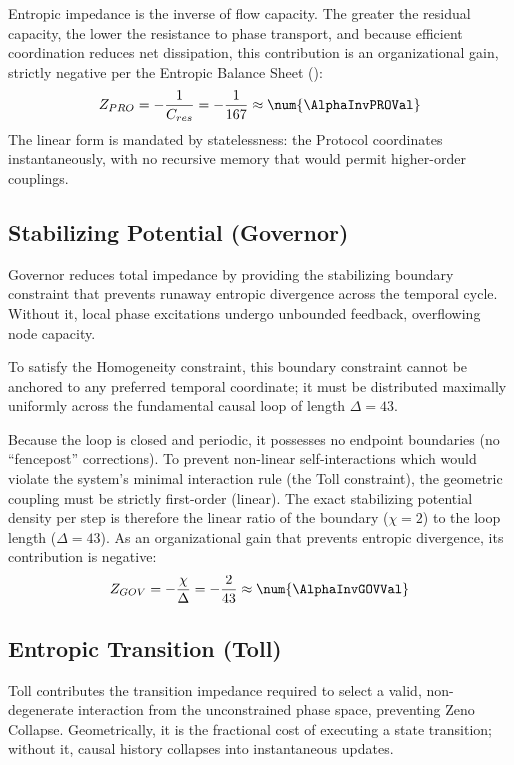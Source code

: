 Entropic impedance is the inverse of flow capacity. The greater the residual capacity, the lower the resistance to phase transport, and because efficient coordination reduces net dissipation, this contribution is an organizational gain, strictly negative per the Entropic Balance Sheet ():
\begin{equation}
    Z_{PRO} = -\frac{1}{C_{res}} = -\frac{1}{167} \approx \num{\AlphaInvPROVal}
\end{equation}
The linear form is mandated by statelessness: the Protocol coordinates instantaneously, with no recursive memory that would permit higher-order couplings.

\subsection{Stabilizing Potential (Governor)}
\label{subsec:alpha_gov}
Governor reduces total impedance by providing the stabilizing boundary constraint that prevents runaway entropic divergence across the temporal cycle. Without it, local phase excitations undergo unbounded feedback, overflowing node capacity.
 
To satisfy the Homogeneity constraint, this boundary constraint cannot be anchored to any preferred temporal coordinate; it must be distributed maximally uniformly across the fundamental causal loop of length $\Delta = 43$. 

Because the loop is closed and periodic, it possesses no endpoint boundaries (no ``fencepost'' corrections). To prevent non-linear self-interactions which would violate the system's minimal interaction rule (the Toll constraint), the geometric coupling must be strictly first-order (linear). The exact stabilizing potential density per step is therefore the linear ratio of the boundary ($\chi = 2$) to the loop length ($\Delta = 43$). As an organizational gain that prevents entropic divergence, its contribution is negative:
\begin{equation}
    Z_{GOV} = -\frac{\chi}{\Delta} = -\frac{2}{43} \approx \num{\AlphaInvGOVVal}
\end{equation}

\subsection{Entropic Transition (Toll)}
\label{subsec:alpha_tol}
Toll contributes the transition impedance required to select a valid, non-degenerate interaction from the unconstrained phase space, preventing Zeno Collapse. Geometrically, it is the fractional cost of executing a state transition; without it, causal history collapses into instantaneous updates.

